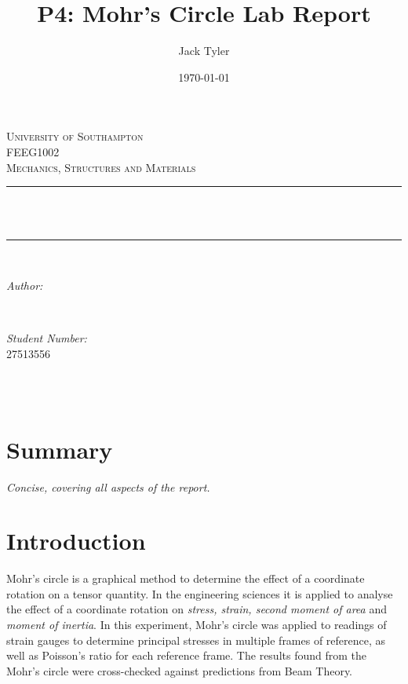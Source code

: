 \documentclass[12pt]{article}
\title{P4: Mohr's Circle Lab Report}								%
\author{Jack Tyler}								%
\date{\today}											%
\makeatletter
\let\thetitle\@title
\let\theauthor\@author
\let\thedate\@date
\makeatother
\begin{document}

\begin{titlepage}
	\centering
    \vspace*{0.5 cm}
    \textsc{\LARGE University of Southampton}\\[2.0 cm]	%
	\textsc{\Large FEEG1002}\\[0.5 cm]				%
	\textsc{\large Mechanics, Structures and Materials}\\[0.5 cm]				%
	\rule{\linewidth}{0.2 mm} \\[0.4 cm]
	{ \huge \bfseries \thetitle}\\
	\rule{\linewidth}{0.2 mm} \\[1.5 cm]
	
	\begin{minipage}{0.4\textwidth}
		\begin{flushleft} \large
			\emph{Author:}\\
			\theauthor
			\end{flushleft}
			\end{minipage}~
			\begin{minipage}{0.4\textwidth}
			\begin{flushright} \large
			\emph{Student Number:} \\
			27513556									%
		\end{flushright}
	\end{minipage}\\[2 cm]
	
	{\large \thedate}\\[2 cm]
 
	\vfill
	
\end{titlepage}
\tableofcontents
\newpage
\section{Summary}
\textit{Concise, covering all aspects of the report.}

\section{Introduction}
Mohr’s circle is a graphical method to determine the effect of a coordinate rotation on a tensor quantity. In the engineering sciences it is applied to analyse the effect of a coordinate rotation on \textit{stress, strain, second moment of area} and \textit{moment of inertia}. In this experiment, Mohr's circle was applied to readings of strain gauges to determine principal stresses in multiple frames of reference, as well as Poisson's ratio for each reference frame. The results found from the Mohr's circle were cross-checked against predictions from Beam Theory. \\
\end{document}

